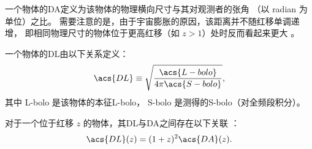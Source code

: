 一个物体的\acf{DA}定义为该物体的物理横向尺寸与其对观测者的张角
（以 \si{radian} 为单位）之比。
需要注意的是，由于宇宙膨胀的原因，该距离并不随红移单调递增，
即相同物理尺寸的物体位于更高红移（如 $z > 1$）处时反而看起来更大 \cite{hogg1999}。

一个物体的\acf{DL}由以下关系定义：
\begin{equation}
  \label{eq:dl-def}
  \acs{DL} \equiv \sqrt{\frac{\acs{L-bolo}}{4\pi \acs{S-bolo}}},
\end{equation}
其中 \acs{L-bolo} 是该物体的本征\acl{L-bolo}，
\acs{S-bolo} 是测得的\acl{S-bolo}（对全频段积分）。

对于一个位于红移 $z$ 的物体，其\acl{DL}与\acl{DA}之间存在以下关联
\cite{weinberg1972,hogg1999,ellis2007}：
\begin{equation}
  \label{eq:dl-da}
  \acs{DL}(z) = (1+z)^2 \acs{DA}(z).
\end{equation}


